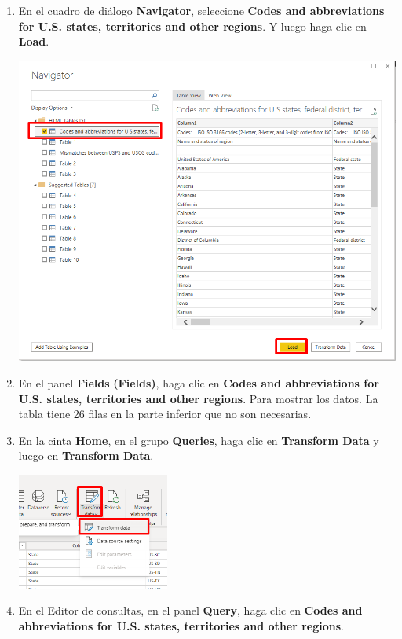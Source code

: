 \documentclass[12pt,letterpaper]{article}
\newcommand\tab[1][1cm]{\hspace*{#1}}
\begin{document}
\begin{enumerate}[\tab 1.]
        \item En el cuadro de diálogo \textbf{Navigator}, seleccione \textbf{Codes and abbreviations for U.S. states, territories and other regions}. Y luego haga clic en \textbf{Load}.
        \begin{center}
            \includegraphics[width=13cm]{./img/img55.png}
        \end{center}
        \item En el panel \textbf{Fields} \textbf{(Fields)}, haga clic en \textbf{Codes and abbreviations for U.S. states, territories and other regions}. Para mostrar los datos. La tabla tiene 26 filas en la parte inferior que no son necesarias.
        \item En la cinta \textbf{Home}, en el grupo \textbf{Queries}, haga clic en \textbf{Transform Data} y luego en \textbf{Transform Data}.
        \begin{center}
            \includegraphics[width=5cm]{./img/img57.png}
        \end{center}
        \item En el Editor de consultas, en el panel \textbf{Query}, haga clic en \textbf{Codes and abbreviations for U.S. states, territories and other regions}.

\end{enumerate}
\end{document}
